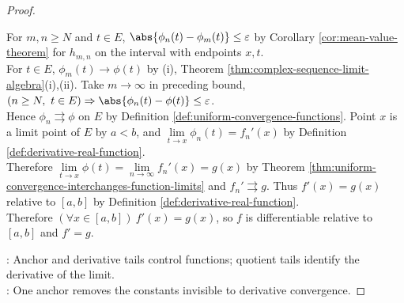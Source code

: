\begin{theorem}
\begin{proof}
\begin{enumerate}[label=(\roman*)]
For $m,n\geq N$ and $t\in E$, $\abs{\phi_n(t)-\phi_m(t)}\leq\varepsilon$ by Corollary \ref{cor:mean-value-theorem} for $h_{m,n}$ on the interval with endpoints $x,t$.\\
For $t\in E$, $\phi_m(t)\to\phi(t)$ by (i), Theorem \ref{thm:complex-sequence-limit-algebra}(i),(ii). Take $m\to\infty$ in preceding bound, $(n\geq N,\ t\in E)\Rightarrow\abs{\phi_n(t)-\phi(t)}\leq\varepsilon$.\\
Hence $\phi_n\rightrightarrows\phi$ on $E$ by Definition \ref{def:uniform-convergence-functions}. Point $x$ is a limit point of $E$ by $a<b$, and $\lim\limits_{t\to x}\phi_n(t)=f_n'(x)$ by Definition \ref{def:derivative-real-function}.\\
Therefore $\lim\limits_{t\to x}\phi(t)=\lim\limits_{n\to\infty}f_n'(x)=g(x)$ by Theorem \ref{thm:uniform-convergence-interchanges-function-limits} and $f_n'\rightrightarrows g$. Thus $f'(x)=g(x)$ relative to $[a,b]$ by Definition \ref{def:derivative-real-function}.\\
Therefore $(\forall x\in[a,b])\ f'(x)=g(x)$, so $f$ is differentiable relative to $[a,b]$ and $f'=g$.
\end{enumerate}
: Anchor and derivative tails control functions; quotient tails identify the derivative of the limit.\\
: One anchor removes the constants invisible to derivative convergence.
\end{proof}
\end{theorem}
